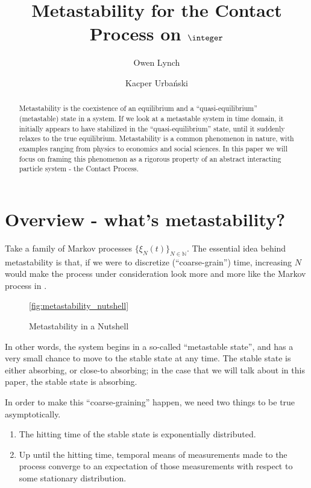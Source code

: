 \documentclass{scrartcl}
\title{Metastability for the Contact Process on $\integer$}
\author{Owen Lynch \and Kacper Urbański}
\begin{document}
\maketitle
\begin{abstract}
    Metastability is the coexistence of an equilibrium and a ``quasi-equilibrium'' (metastable) state in a system. If we look at a metastable system in time domain, it 
    initially appears to have stabilized in the ``quasi-equilibrium'' state,
    until it suddenly relaxes to the true equilibrium. Metastability is a common phenomenon in nature, with examples ranging from physics to economics and social sciences. 
    In this paper we will focus on framing this phenomenon as a rigorous property of an abstract interacting particle system - the Contact Process.
\end{abstract}

\section{Overview - what's metastability?} \label{overview}

Take a family of Markov processes $\{\xi_N(t)\}_{N\in\mathbb{N}}$. The essential idea behind metastability is that, if we were to discretize (``coarse-grain'') time, increasing $N$
would make
the process under consideration look more and more like the Markov process in .

\begin{figure}[h!]
  \centering

  \caption{Metastability in a Nutshell}
  \ref{fig:metastability_nutshell}
\end{figure}

In other words, the system begins in a so-called ``metastable state'', and has a very small chance to move to the stable state at any time. The stable state is either absorbing, or close-to absorbing; in the case that we will talk about in this paper, the stable state is absorbing.

In order to make this ``coarse-graining'' happen, we need two things to be true asymptotically.

\begin{enumerate}
  \item The hitting time of the stable state is exponentially distributed.
  \item Up until the hitting time, temporal means of measurements made to the process converge to an expectation of those measurements with respect to some stationary distribution.
\end{enumerate}
\end{document}
